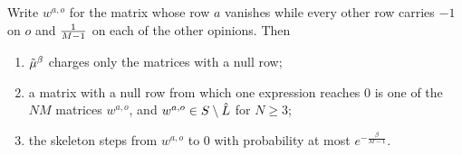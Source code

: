 \begin{lemma}
  \label{aux-zero-predecessors}
  \leanok
  Write $w^{a,o}$ for the matrix whose row $a$ vanishes while every other row
  carries $-1$ on $o$ and $\tfrac{1}{M-1}$ on each of the other opinions.  Then
  \begin{enumerate}
    \item $\tilde{\mu}^\beta$ charges only the matrices with a null row;
    \item a matrix with a null row from which one expression reaches $0$ is one
      of the $NM$ matrices $w^{a,o}$, and $w^{a,o} \in S \setminus \hat{L}$
      for $N \ge 3$;
    \item the skeleton steps from $w^{a,o}$ to $0$ with probability at most
      $e^{-\frac{\beta}{M-1}}$.
  \end{enumerate}
\end{lemma}
